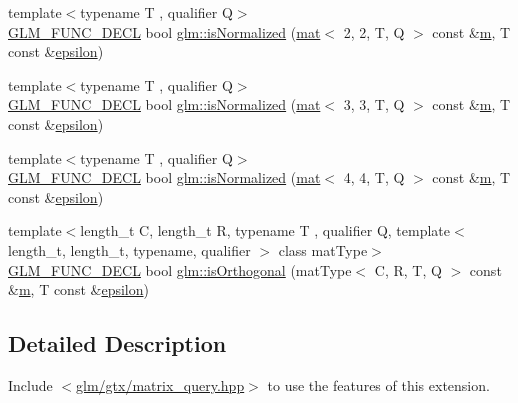 \begin{DoxyCompactItemize}
\item 
{\footnotesize template$<$typename T , qualifier Q$>$ }\\\hyperlink{setup_8hpp_ab2d052de21a70539923e9bcbf6e83a51}{G\+L\+M\+\_\+\+F\+U\+N\+C\+\_\+\+D\+E\+CL} bool \hyperlink{group__gtx__matrix__query_gae785af56f47ce220a1609f7f84aa077a}{glm\+::is\+Normalized} (\hyperlink{structglm_1_1mat}{mat}$<$ 2, 2, T, Q $>$ const \&\hyperlink{_s_d_l__opengl__glext_8h_af593500c283bf1a787a6f947f503a5c2}{m}, T const \&\hyperlink{group__gtc__constants_ga2a1e57fc5592b69cfae84174cbfc9429}{epsilon})
\item 
{\footnotesize template$<$typename T , qualifier Q$>$ }\\\hyperlink{setup_8hpp_ab2d052de21a70539923e9bcbf6e83a51}{G\+L\+M\+\_\+\+F\+U\+N\+C\+\_\+\+D\+E\+CL} bool \hyperlink{group__gtx__matrix__query_gaa068311695f28f5f555f5f746a6a66fb}{glm\+::is\+Normalized} (\hyperlink{structglm_1_1mat}{mat}$<$ 3, 3, T, Q $>$ const \&\hyperlink{_s_d_l__opengl__glext_8h_af593500c283bf1a787a6f947f503a5c2}{m}, T const \&\hyperlink{group__gtc__constants_ga2a1e57fc5592b69cfae84174cbfc9429}{epsilon})
\item 
{\footnotesize template$<$typename T , qualifier Q$>$ }\\\hyperlink{setup_8hpp_ab2d052de21a70539923e9bcbf6e83a51}{G\+L\+M\+\_\+\+F\+U\+N\+C\+\_\+\+D\+E\+CL} bool \hyperlink{group__gtx__matrix__query_ga4d9bb4d0465df49fedfad79adc6ce4ad}{glm\+::is\+Normalized} (\hyperlink{structglm_1_1mat}{mat}$<$ 4, 4, T, Q $>$ const \&\hyperlink{_s_d_l__opengl__glext_8h_af593500c283bf1a787a6f947f503a5c2}{m}, T const \&\hyperlink{group__gtc__constants_ga2a1e57fc5592b69cfae84174cbfc9429}{epsilon})
\item 
{\footnotesize template$<$length\+\_\+t C, length\+\_\+t R, typename T , qualifier Q, template$<$ length\+\_\+t, length\+\_\+t, typename, qualifier $>$ class mat\+Type$>$ }\\\hyperlink{setup_8hpp_ab2d052de21a70539923e9bcbf6e83a51}{G\+L\+M\+\_\+\+F\+U\+N\+C\+\_\+\+D\+E\+CL} bool \hyperlink{group__gtx__matrix__query_ga58f3289f74dcab653387dd78ad93ca40}{glm\+::is\+Orthogonal} (mat\+Type$<$ C, R, T, Q $>$ const \&\hyperlink{_s_d_l__opengl__glext_8h_af593500c283bf1a787a6f947f503a5c2}{m}, T const \&\hyperlink{group__gtc__constants_ga2a1e57fc5592b69cfae84174cbfc9429}{epsilon})
\end{DoxyCompactItemize}


\subsection{Detailed Description}
Include $<$\hyperlink{matrix__query_8hpp}{glm/gtx/matrix\+\_\+query.\+hpp}$>$ to use the features of this extension.

